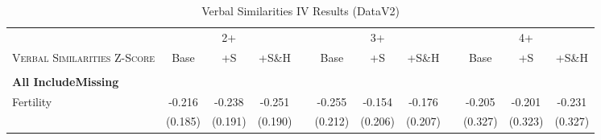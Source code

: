 \begin{landscape}\begin{table}[htpb!]\caption{Verbal Similarities IV Results (DataV2)}
\label{TWINtab:IVAll}
\begin{center}\begin{tabular}{lcccp{2mm}cccp{2mm}ccc}
\toprule \toprule 
&\multicolumn{3}{c}{2+}&&\multicolumn{3}{c}{3+}&&\multicolumn{3}{c}{4+}\\ \cmidrule(r){2-4} \cmidrule(r){6-8} \cmidrule(r){10-12} 
\textsc{Verbal Similarities Z-Score}&Base&+S&+S\&H&&Base&+S&+S\&H&&Base&+S&+S\&H\\ \midrule 
\begin{footnotesize}\end{footnotesize}& 
\begin{footnotesize}\end{footnotesize}& 
\begin{footnotesize}\end{footnotesize}& 
\begin{footnotesize}\end{footnotesize}& 
\begin{footnotesize}\end{footnotesize}& 
\begin{footnotesize}\end{footnotesize}& 
\begin{footnotesize}\end{footnotesize}& 
\begin{footnotesize}\end{footnotesize}& 
\begin{footnotesize}\end{footnotesize}& 
\begin{footnotesize}\end{footnotesize}& 
\begin{footnotesize}\end{footnotesize}& 
\begin{footnotesize}\end{footnotesize}\\ 
\multicolumn{12}{l}{\textbf{All IncludeMissing}}\\ 
Fertility&-0.216&-0.238&-0.251&&-0.255&-0.154&-0.176&&-0.205&-0.201&-0.231\\
&(0.185)&(0.191)&(0.190)&&(0.212)&(0.206)&(0.207)&&(0.327)&(0.323)&(0.327)\\

\end{tabular}
\end{center}
\end{table}
\end{landscape}
